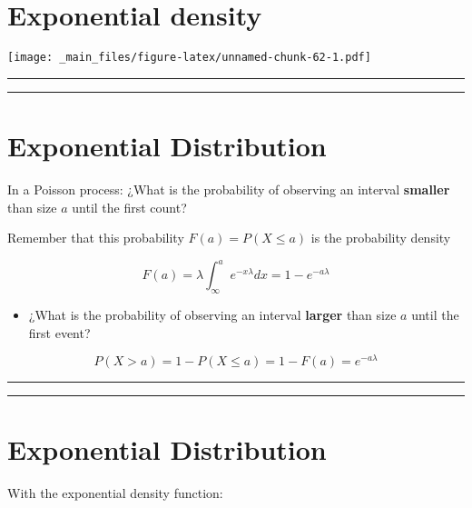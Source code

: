 \documentclass[
]{book}
\providecommand{\tightlist}{%
  \setlength{\itemsep}{0pt}\setlength{\parskip}{0pt}}
\begin{document}
\hypertarget{exponential-density-4}{%
\section{Exponential density}\label{exponential-density-4}}

\texttt{[image: \_main\_files/figure-latex/unnamed-chunk-62-1.pdf]}

\begin{center}\rule{0.5\linewidth}{0.5pt}\end{center}

\begin{center}\rule{0.5\linewidth}{0.5pt}\end{center}

\hypertarget{exponential-distribution}{%
\section{Exponential Distribution}\label{exponential-distribution}}

In a Poisson process: ¿What is the probability of observing an interval \textbf{smaller} than size \(a\) until the first count?

Remember that this probability \(F(a)=P(X \leq a)\) is the probability density

\[F(a)=\lambda \int_\infty^a e^{-x\lambda}dx=1-e^{-a\lambda}\]

\begin{itemize}
\tightlist
\item
  ¿What is the probability of observing an interval \textbf{larger} than size \(a\) until the first event?
\end{itemize}

\[P(X > a)=1- P(X \leq a)= 1- F(a) = e^{-a\lambda}\]

\begin{center}\rule{0.5\linewidth}{0.5pt}\end{center}

\begin{center}\rule{0.5\linewidth}{0.5pt}\end{center}

\hypertarget{exponential-distribution-1}{%
\section{Exponential Distribution}\label{exponential-distribution-1}}

With the exponential density function:
\end{document}
